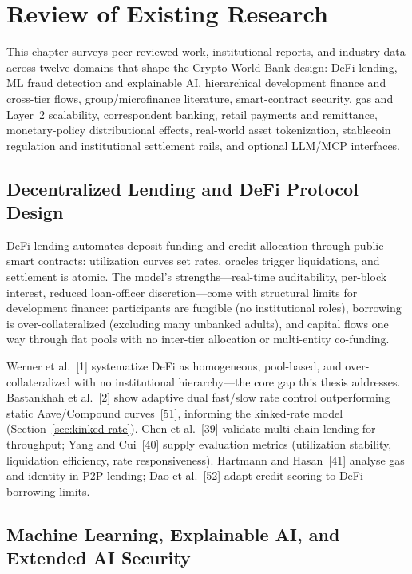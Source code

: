 \documentclass[12pt, a4paper]{report}
\begin{document}
\section{Review of Existing Research}
\label{sec:review-existing}

This chapter surveys peer-reviewed work, institutional reports, and industry data across twelve domains that shape the Crypto World Bank design: DeFi lending, ML fraud detection and explainable AI, hierarchical development finance and cross-tier flows, group/microfinance literature, smart-contract security, gas and Layer~2 scalability, correspondent banking, retail payments and remittance, monetary-policy distributional effects, real-world asset tokenization, stablecoin regulation and institutional settlement rails, and optional LLM/MCP interfaces.

\subsection{Decentralized Lending and DeFi Protocol Design}

DeFi lending automates deposit funding and credit allocation through public smart contracts: utilization curves set rates, oracles trigger liquidations, and settlement is atomic. The model's strengths---real-time auditability, per-block interest, reduced loan-officer discretion---come with structural limits for development finance: participants are fungible (no institutional roles), borrowing is over-collateralized (excluding many unbanked adults), and capital flows one way through flat pools with no inter-tier allocation or multi-entity co-funding.

Werner et al.~[1] systematize DeFi as homogeneous, pool-based, and over-collateralized with no institutional hierarchy---the core gap this thesis addresses. Bastankhah et al.~[2] show adaptive dual fast/slow rate control outperforming static Aave/Compound curves~[51], informing the kinked-rate model (Section~\ref{sec:kinked-rate}). Chen et al.~[39] validate multi-chain lending for throughput; Yang and Cui~[40] supply evaluation metrics (utilization stability, liquidation efficiency, rate responsiveness). Hartmann and Hasan~[41] analyse gas and identity in P2P lending; Dao et al.~[52] adapt credit scoring to DeFi borrowing limits.

\subsection{Machine Learning, Explainable AI, and Extended AI Security}
\end{document}
